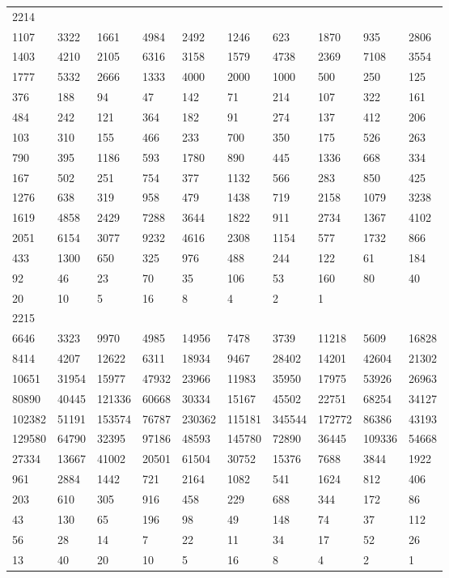 \begin{longtable}{*{10}{l}}
2214&&&&&&&&&\\
1107& 3322& 1661& 4984& 2492& 1246& 623& 1870& 935& 2806\\
1403& 4210& 2105& 6316& 3158& 1579& 4738& 2369& 7108& 3554\\
1777& 5332& 2666& 1333& 4000& 2000& 1000& 500& 250& 125\\
376& 188& 94& 47& 142& 71& 214& 107& 322& 161\\
484& 242& 121& 364& 182& 91& 274& 137& 412& 206\\
103& 310& 155& 466& 233& 700& 350& 175& 526& 263\\
790& 395& 1186& 593& 1780& 890& 445& 1336& 668& 334\\
167& 502& 251& 754& 377& 1132& 566& 283& 850& 425\\
1276& 638& 319& 958& 479& 1438& 719& 2158& 1079& 3238\\
1619& 4858& 2429& 7288& 3644& 1822& 911& 2734& 1367& 4102\\
2051& 6154& 3077& 9232& 4616& 2308& 1154& 577& 1732& 866\\
433& 1300& 650& 325& 976& 488& 244& 122& 61& 184\\
92& 46& 23& 70& 35& 106& 53& 160& 80& 40\\
20& 10& 5& 16& 8& 4& 2& 1& \\

2215&&&&&&&&&\\
6646& 3323& 9970& 4985& 14956& 7478& 3739& 11218& 5609& 16828\\
8414& 4207& 12622& 6311& 18934& 9467& 28402& 14201& 42604& 21302\\
10651& 31954& 15977& 47932& 23966& 11983& 35950& 17975& 53926& 26963\\
80890& 40445& 121336& 60668& 30334& 15167& 45502& 22751& 68254& 34127\\
102382& 51191& 153574& 76787& 230362& 115181& 345544& 172772& 86386& 43193\\
129580& 64790& 32395& 97186& 48593& 145780& 72890& 36445& 109336& 54668\\
27334& 13667& 41002& 20501& 61504& 30752& 15376& 7688& 3844& 1922\\
961& 2884& 1442& 721& 2164& 1082& 541& 1624& 812& 406\\
203& 610& 305& 916& 458& 229& 688& 344& 172& 86\\
43& 130& 65& 196& 98& 49& 148& 74& 37& 112\\
56& 28& 14& 7& 22& 11& 34& 17& 52& 26\\
13& 40& 20& 10& 5& 16& 8& 4& 2& 1\\


\end{longtable}
